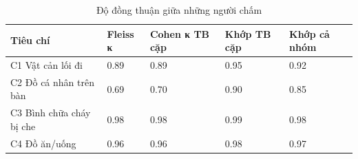 \begin{table}[t]
\centering
\caption{Độ đồng thuận giữa những người chấm}
\footnotesize
\begin{tabular}{lllll}
\hline
Tiêu chí & Fleiss κ & Cohen κ TB cặp & Khớp TB cặp & Khớp cả nhóm \\
\hline
C1 Vật cản lối đi & 0.89 & 0.89 & 0.95 & 0.92 \\
C2 Đồ cá nhân trên bàn & 0.69 & 0.70 & 0.90 & 0.85 \\
C3 Bình chữa cháy bị che & 0.98 & 0.98 & 0.99 & 0.98 \\
C4 Đồ ăn/uống & 0.96 & 0.96 & 0.98 & 0.97 \\
\hline
\end{tabular}
\end{table}